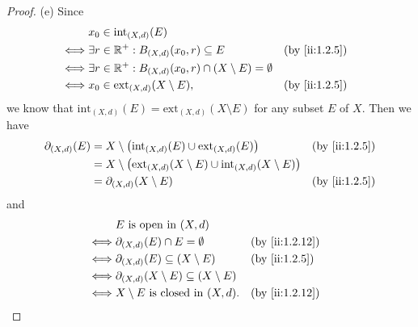 \begin{proof}{(e)}
  Since
  \begin{align*}
         & x_0 \in \text{int}_{(X, d)}(E)                                                              \\
    \iff & \exists r \in \R^+ : B_{(X, d)}(x_0, r) \subseteq E                      &  & \by{ii:1.2.5} \\
    \iff & \exists r \in \R^+ : B_{(X, d)}(x_0, r) \cap (X \setminus E) = \emptyset                    \\
    \iff & x_0 \in \text{ext}_{(X, d)}(X \setminus E),                              &  & \by{ii:1.2.5}
  \end{align*}
  we know that \(\text{int}_{(X, d)}(E) = \text{ext}_{(X, d)}(X \setminus E)\) for any subset \(E\) of \(X\).
  Then we have
  \begin{align*}
    \partial_{(X, d)}(E) & = X \setminus \big(\text{int}_{(X, d)}(E) \cup \text{ext}_{(X, d)}(E)\big)                         &  & \by{ii:1.2.5} \\
                         & = X \setminus \big(\text{ext}_{(X, d)}(X \setminus E) \cup \text{int}_{(X, d)}(X \setminus E)\big)                    \\
                         & = \partial_{(X, d)}(X \setminus E)                                                                 &  & \by{ii:1.2.5}
  \end{align*}
  and
  \begin{align*}
         & E \text{ is open in } (X, d)                                                   \\
    \iff & \partial_{(X, d)}(E) \cap E = \emptyset                    &  & \by{ii:1.2.12} \\
    \iff & \partial_{(X, d)}(E) \subseteq (X \setminus E)             &  & \by{ii:1.2.5}  \\
    \iff & \partial_{(X, d)}(X \setminus E) \subseteq (X \setminus E)                     \\
    \iff & X \setminus E \text{ is closed in } (X, d).                &  & \by{ii:1.2.12}
  \end{align*}
\end{proof}

